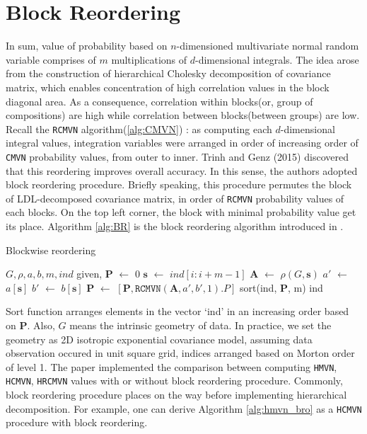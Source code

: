 \section{Block Reordering}

In sum, value of probability based on $n$-dimensioned multivariate normal random variable comprises of $m$ multiplications of $d$-dimensional integrals. The idea arose from the construction of hierarchical Cholesky decomposition of covariance matrix, which enables concentration of high correlation values in the block diagonal area. As a consequence, correlation within blocks(or, group of compositions) are high while correlation between blocks(between groups) are low. Recall the \texttt{RCMVN} algorithm(\ref{alg:CMVN}) : as computing each $d$-dimensional integral values, integration variables were arranged in order of increasing order of \texttt{CMVN} probability values, from outer to inner. Trinh and Genz (2015) discovered that this reordering improves overall accuracy. In this sense, the authors adopted block reordering procedure. Briefly speaking, this procedure permutes the block of LDL-decomposed covariance matrix, in order of \texttt{RCMVN} probability values of each blocks. On the top left corner, the block with minimal probability value get its place. Algorithm \ref{alg:BR} is the block reordering algorithm introduced in \citet{cao2019hierarchical}.

\begin{algorithm}[ht]
    \caption{Blockwise reordering}
	\begin{algorithmic}[1]
            \State $G, \rho, a, b, m, ind$ given, $\mathbf{P}$ $\leftarrow$ $0$
                \State $\mathbf{s}$ $\leftarrow$ $ind[i:i+m-1]$
                \State $\mathbf{A}$ $\leftarrow$ $\rho(G, \mathbf{s})$
                \State $a'$ $\leftarrow$ $a[\mathbf{s}]$
                \State $b'$ $\leftarrow$ $b[\mathbf{s}]$
                \State $\mathbf{P}$ $\leftarrow$ $[\mathbf{P}, \texttt{RCMVN}(\mathbf{A},a',b',1).P]$
            \EndFor
            \State sort(ind, $\mathbf{P}$, m)
            \State \Return ind
        \EndProcedure
    \end{algorithmic}\label{alg:BR}
\end{algorithm}

Sort function arranges elements in the vector `ind' in an increasing order based on $\mathbf{P}$. Also, $G$ means the intrinsic geometry of data. In practice, we set the geometry as 2D isotropic exponential covariance model, assuming data observation occured in unit square grid, indices arranged based on Morton order of level 1. The paper implemented the comparison between computing \texttt{HMVN}, \texttt{HCMVN}, \texttt{HRCMVN} values with or without block reordering procedure. Commonly, block reordering procedure places on the way before implementing hierarchical decomposition. For example, one can derive Algorithm \ref{alg:hmvn_bro} as a \texttt{HCMVN} procedure with block reordering.

